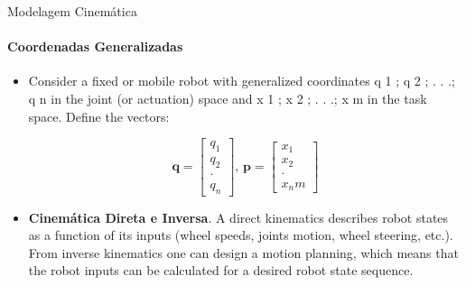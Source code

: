 \documentclass{beamer}
\begin{document}
\begin{frame}{Modelagem Cinemática}
    \framesubtitle{Coordenadas Generalizadas}
    \begin{itemize}
        \item Consider a fixed or mobile robot with generalized coordinates q 1 ; q 2 ; . . .; q n in the
              joint (or actuation) space and x 1 ; x 2 ; . . .; x m in the task space. Define the vectors:

              \begin{equation*}
                  \mathbf{q} =
                  \begin{bmatrix}
                      q_1 \\q_2 \\ \cdot  \\ q_n
                  \end{bmatrix}
                  \text{, }
                  \mathbf{p} =
                  \begin{bmatrix}
                      x_1 \\x_2 \\ \cdot  \\ x_nm
                  \end{bmatrix}
              \end{equation*}

        \item \textbf{Cinemática Direta e Inversa}. A direct kinematics describes
              robot states as a function of its inputs (wheel speeds, joints motion,
              wheel steering, etc.). From inverse kinematics one can design a motion
              planning, which means that the robot inputs can be calculated for a
              desired robot state sequence.

    \end{itemize}
\end{frame}
\end{document}
